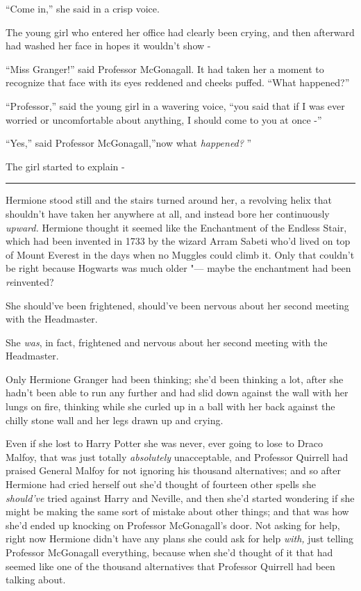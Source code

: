``Come in,'' she said in a crisp voice.

The young girl who entered her office had clearly been crying, and then
afterward had washed her face in hopes it wouldn't show -

``Miss Granger!'' said Professor McGonagall. It had taken her a moment
to recognize that face with its eyes reddened and cheeks puffed. ``What
happened?''

``Professor,'' said the young girl in a wavering voice, ``you said that
if I was ever worried or uncomfortable about anything, I should come to
you at once -''

``Yes,'' said Professor McGonagall,''now what \emph{happened?} ''

The girl started to explain -

\begin{center}\rule{3in}{0.4pt}\end{center}

Hermione stood still and the stairs turned around her, a revolving helix
that shouldn't have taken her anywhere at all, and instead bore her
continuously \emph{upward.} Hermione thought it seemed like the
Enchantment of the Endless Stair, which had been invented in 1733 by the
wizard Arram Sabeti who'd lived on top of Mount Everest in the days when
no Muggles could climb it. Only that couldn't be right because Hogwarts
was much older "--- maybe the enchantment had been \emph{re}invented?

She should've been frightened, should've been nervous about her second
meeting with the Headmaster.

She \emph{was}, in fact, frightened and nervous about her second meeting
with the Headmaster.

Only Hermione Granger had been thinking; she'd been thinking a lot,
after she hadn't been able to run any further and had slid down against
the wall with her lungs on fire, thinking while she curled up in a ball
with her back against the chilly stone wall and her legs drawn up and
crying.

Even if she lost to Harry Potter she was never, ever going to lose to
Draco Malfoy, that was just totally \emph{absolutely} unacceptable, and
Professor Quirrell had praised General Malfoy for not ignoring his
thousand alternatives; and so after Hermione had cried herself out she'd
thought of fourteen other spells she \emph{should've} tried against
Harry and Neville, and then she'd started wondering if she might be
making the same sort of mistake about other things; and that was how
she'd ended up knocking on Professor McGonagall's door. Not asking for
help, right now Hermione didn't have any plans she could ask for help
\emph{with,} just telling Professor McGonagall everything, because when
she'd thought of it that had seemed like one of the thousand
alternatives that Professor Quirrell had been talking about.

